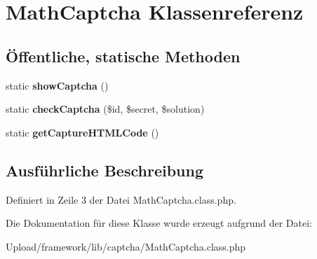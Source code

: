 \hypertarget{class_math_captcha}{}\section{Math\+Captcha Klassenreferenz}
\label{class_math_captcha}
\subsection*{Öffentliche, statische Methoden}
\begin{DoxyCompactItemize}
\item 
\mbox{\label{class_math_captcha_a714fb21f72163502f1c150aeecc6ec9c}} 
static {\bfseries show\+Captcha} ()
\item 
\mbox{\label{class_math_captcha_a7704c8d67e5bc29872cdab20744581f6}} 
static {\bfseries check\+Captcha} (\$id, \$secret, \$solution)
\item 
\mbox{\label{class_math_captcha_a94a358cbebe3a65ff242317a6deee569}} 
static {\bfseries get\+Capture\+H\+T\+M\+L\+Code} ()
\end{DoxyCompactItemize}


\subsection{Ausführliche Beschreibung}


Definiert in Zeile 3 der Datei Math\+Captcha.\+class.\+php.



Die Dokumentation für diese Klasse wurde erzeugt aufgrund der Datei\+:\begin{DoxyCompactItemize}
\item 
Upload/framework/lib/captcha/Math\+Captcha.\+class.\+php\end{DoxyCompactItemize}
